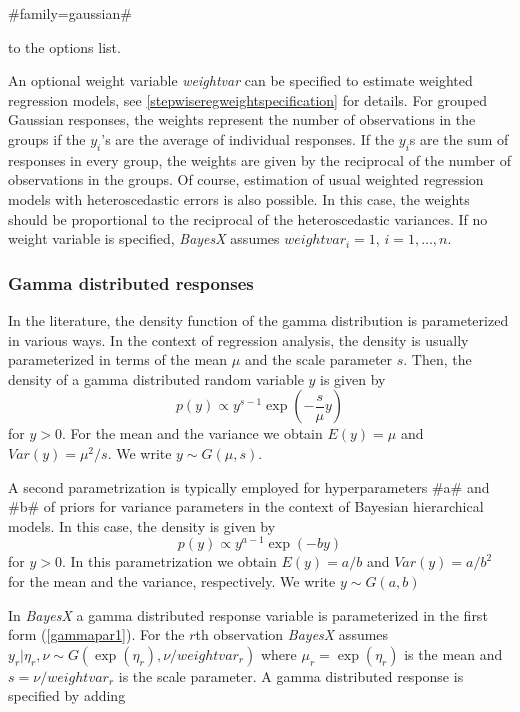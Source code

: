 #family=gaussian#

to the options list.

An optional weight variable {\em weightvar} can be specified to
estimate weighted regression models, see
\autoref{stepwiseregweightspecification} for details. For grouped Gaussian
responses, the weights represent the number of observations in the
groups if the $y_i$'s are the average of individual responses. If
the $y_i$s are the sum of responses in every group, the weights are
given by the reciprocal of the number of observations in the groups.
Of course, estimation of usual weighted regression models with
heteroscedastic errors is also possible. In this case, the weights
should be proportional to the reciprocal of the heteroscedastic
variances. If no weight variable is specified, {\em BayesX} assumes
$weightvar_i = 1$, $i=1,\dots,n$.

\subsubsection*{Gamma distributed responses}

In the literature, the density function of the gamma distribution
is parameterized in various ways. In the context of regression
analysis, the density is usually parameterized in terms of the
mean $\mu$ and the scale parameter $s$. Then, the density of a
gamma distributed random variable $y$ is given by
\begin{equation}
\label{gammapar1} p(y) \propto y^{s-1}\exp \left( -\frac{s}{\mu} y \right)
\end{equation}
for $y > 0$. For the mean and the variance we obtain $E(y) = \mu$
and $Var(y) = \mu^2/s$. We write $y \sim G(\mu,s)$.

A second parametrization is typically employed for
hyperparameters #a# and #b# of priors for variance parameters in
the context of Bayesian hierarchical models. In this case, the
density is given by
\begin{equation}
\label{gammapar2} p(y) \propto y^{a-1}\exp(-b y)
\end{equation}
for $y>0$. In this parametrization we obtain $E(y) = a/b$ and
$Var(y) = a/b^2$ for the mean and the variance, respectively. We
write $y \sim G(a,b)$

In {\em BayesX} a gamma distributed response variable is
parameterized in the first form (\ref{gammapar1}). For the $r$th
observation {\em BayesX} assumes  $y_r | \eta_r,\nu \sim
G(\exp(\eta_r),\nu/weightvar_r)$ where $\mu_r = \exp(\eta_r)$ is
the mean and $s=\nu/weightvar_r$ is the scale parameter. A gamma
distributed response is specified by adding


